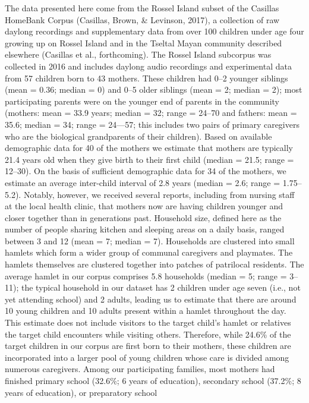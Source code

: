 \documentclass[,man,floatsintext]{apa6}
\begin{document}
The data presented here come from the Rossel Island subset of the
Casillas HomeBank Corpus (Casillas, Brown, \& Levinson, 2017), a
collection of raw daylong recordings and supplementary data from over
100 children under age four growing up on Rossel Island and in the
Tseltal Mayan community described elsewhere (Casillas et al.,
forthcoming). The Rossel Island subcorpus was collected in 2016 and
includes daylong audio recordings and experimental data from 57 children
born to 43 mothers. These children had 0--2 younger siblings (mean =
0.36; median = 0) and 0--5 older siblings (mean = 2; median = 2); most
participating parents were on the younger end of parents in the
community (mothers: mean = 33.9 years; median = 32; range = 24--70 and
fathers: mean = 35.6; median = 34; range = 24---57; this includes two
pairs of primary caregivers who are the biological grandparents of their
children). Based on available demographic data for 40 of the mothers we
estimate that mothers are typically 21.4 years old when they give birth
to their first child (median = 21.5; range = 12--30). On the basis of
sufficient demographic data for 34 of the mothers, we estimate an
average inter-child interval of 2.8 years (median = 2.6; range =
1.75--5.2). Notably, however, we received several reports, including
from nursing staff at the local health clinic, that mothers now are
having children younger and closer together than in generations past.
Household size, defined here as the number of people sharing kitchen and
sleeping areas on a daily basis, ranged between 3 and 12 (mean = 7;
median = 7). Households are clustered into small hamlets which form a
wider group of communal caregivers and playmates. The hamlets themselves
are clustered together into patches of patrilocal residents. The average
hamlet in our corpus comprises 5.8 households (median = 5; range =
3--11); the typical household in our dataset has 2 children under age
seven (i.e., not yet attending school) and 2 adults, leading us to
estimate that there are around 10 young children and 10 adults present
within a hamlet throughout the day. This estimate does not include
visitors to the target child's hamlet or relatives the target child
encounters while visiting others. Therefore, while 24.6\% of the target
children in our corpus are first born to their mothers, these children
are incorporated into a larger pool of young children whose care is
divided among numerous caregivers. Among our participating families,
most mothers had finished primary school (32.6\%; 6 years of education),
secondary school (37.2\%; 8 years of education), or preparatory school
\end{document}
